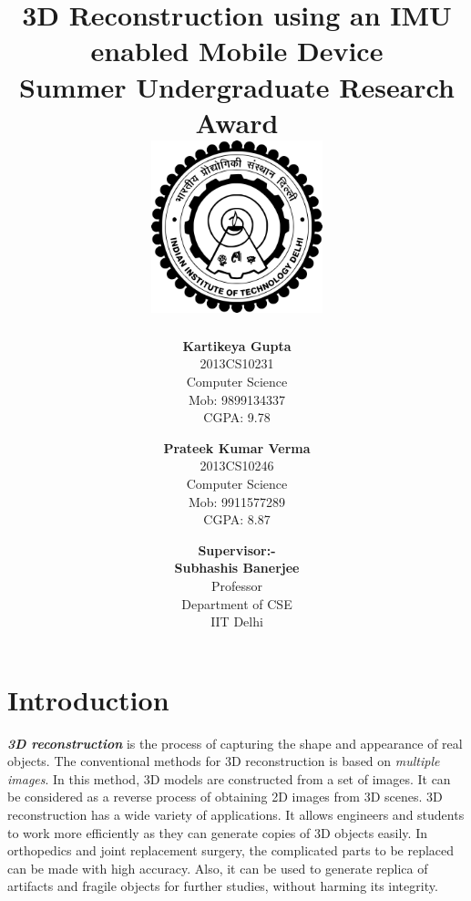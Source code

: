 \documentclass{article}
\title{\vspace*{\fill} \textbf{3D Reconstruction using an IMU enabled Mobile Device}
	  \\ {\large \textbf{Summer Undergraduate Research Award}}
	  \\  \vspace{3mm} \includegraphics[width=5cm]{logo.png}}
\author{
	\textbf{Kartikeya Gupta}\\ 
	2013CS10231\\
	Computer Science\\
	Mob: 9899134337\\
	CGPA: 9.78
	\and
	\textbf{Prateek Kumar Verma}\\ 
	2013CS10246\\
	Computer Science\\
	Mob: 9911577289\\
	CGPA: 8.87
}
\date{\textbf{Supervisor:-} \\ \textbf{Subhashis Banerjee} \\ Professor \\ Department of CSE \\ IIT Delhi \vspace*{\fill}}
\begin{document}
	\maketitle

	\newpage
	
	\section{Introduction}
		\textit{\textbf{3D reconstruction}} is the process of capturing the shape and appearance of real objects. The conventional methods for 3D reconstruction is based on \textit{multiple images}. In this method, 3D models are constructed from a set of images. It can be considered as a reverse process of obtaining 2D images from 3D scenes.
		\newline
		3D reconstruction has a wide variety of applications. It allows engineers and students to work more efficiently as they can generate copies of 3D objects easily. In orthopedics and joint replacement surgery, the complicated parts to be replaced can be made with high accuracy. Also, it can be used to generate replica of artifacts and fragile objects for further studies, without harming its integrity.
\end{document}
